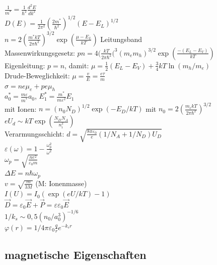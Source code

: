 \documentclass[12pt,a4paper]{article}
\newcommand{\dd}[2]{\frac{d^2 #1}{d #2^2}}
\renewcommand{\=}[1]{\stackrel{#1}{=}}
\theoremstyle{definition}
\theoremstyle{remark}
\begin{document}
$\frac{1}{m^*} = \frac{1}{\hbar^2} \dd{E}{k}$\\
$D(E) = \frac{1}{2\pi^2} (\frac{2m^*}{\hbar^2})^{1/2} (E-E_L)^{1/2}$\\
$n = 2 (\frac{m^* kT}{2\pi \hbar^2})^{3/2} \exp (\frac{\mu - E_L}{kT})$ Leitungsband\\
Massenwirkungsgesetz: $pn = 4 (\frac{kT}{2\pi \hbar^2}(^3 (m_e m_h)^{3/2} \exp (\frac{-(E_L - E_V)}{kT})$\\
Eigenleitung: $p=n$, damit: $\mu = \frac{1}{2} (E_L - E_V) + \frac{3}{4} kT \ln (m_h / m_e)$\\
Drude-Beweglichkeit: $\mu = \frac{v}{E} = \frac{e \tau}{m}$\\
$\sigma = n e \mu_e + p e \mu_h$\\
$a_0^* = \frac{m \varepsilon}{m^*} a_0$, $E_1^* = \frac{m^*}{m \varepsilon^2} E_1$\\
mit Ionen: $n = (n_0 N_D)^{1/2} \exp( -E_D/kT)$ mit $n_0 = 2 (\frac{m_e kT}{2\pi \hbar^2})^{3/2}$\\
$eU_d \sim kT \exp (\frac{N_D N_A}{n_i^2})$\\
Verarmungsschicht: $d = \sqrt{\frac{8 \pi \varepsilon_0}{e} (1/N_A + 1/N_D) U_D}$\\
$\varepsilon(\omega) = 1- \frac{\omega_p^2}{\omega^2}$\\
$\omega_p = \sqrt{\frac{ne^2}{\varepsilon_0 m}} $\\
$\Delta E = n \hbar \omega_p$\\
$v = \sqrt{\frac{m}{3M}}$ (M: Ionenmasse)\\
$I(U) = I_0 (\exp(eU/kT) - 1)$\\
$\vec D = \varepsilon_0 \vec E + \vec P = \varepsilon \varepsilon_0 \vec E$\\
$1/k_s \sim 0,5 (n_0 / a_0^3)^{-1/6}$\\
$\varphi(r) = 1/{4\pi \varepsilon_0} \frac{q}{r} e^{-k_s r}$

\subsection{magnetische Eigenschaften}

\begin{center}
\begin{minipage}[t]{.35\linewidth}
\vspace{0pt}
\noindent\begin{tabular}{ll}
\toprule

\bottomrule
\end{tabular}
\end{minipage}%
\begin{minipage}[t]{.65\linewidth}
\vspace{0pt}
\begin{tabular}{ll}
\toprule


\end{tabular}
\end{minipage}
\end{center}
\end{document}
